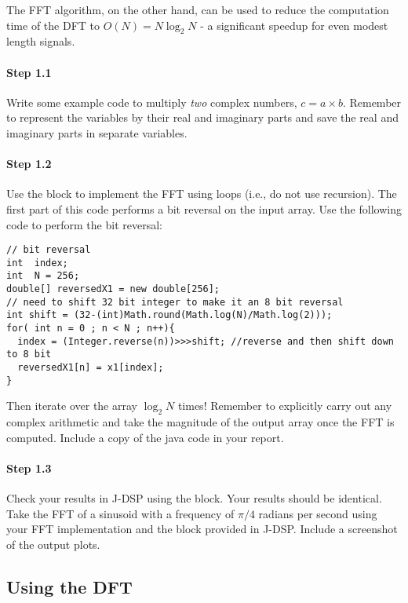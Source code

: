The FFT algorithm, on the other hand, can be used to reduce the
computation time of the DFT to $O(N)=N\log_2 N$ - a significant
speedup for even modest length signals.

\paragraph{Step 1.1}
Write some example code to multiply \emph{two} complex numbers,
$c=a\times b$. Remember to represent the variables by their real and
imaginary parts and save the real and imaginary parts in separate
variables.


\paragraph{Step 1.2} 
Use the  block to implement the FFT using loops
(i.e., do not use recursion). The first part of this code performs a
bit reversal on the input array. Use the following code to perform the
bit reversal:
\begin{lstlisting}
// bit reversal
int  index;
int  N = 256;
double[] reversedX1 = new double[256];
// need to shift 32 bit integer to make it an 8 bit reversal
int shift = (32-(int)Math.round(Math.log(N)/Math.log(2))); 
for( int n = 0 ; n < N ; n++){
  index = (Integer.reverse(n))>>>shift; //reverse and then shift down to 8 bit
  reversedX1[n] = x1[index]; 
}
\end{lstlisting}
Then iterate over the array $\log_2 N$ times! Remember to explicitly
carry out any complex arithmetic and take the magnitude of the output
array once the FFT is computed. Include a copy of the java code in
your report.

\paragraph{Step 1.3} 
Check your results in J-DSP using the  block. Your results
should be identical. Take the FFT of a sinusoid with a frequency of
$\pi/4$ radians per second using your FFT implementation and the
 block provided in J-DSP. Include a screenshot of the
output plots.



\subsection{Using the DFT}

